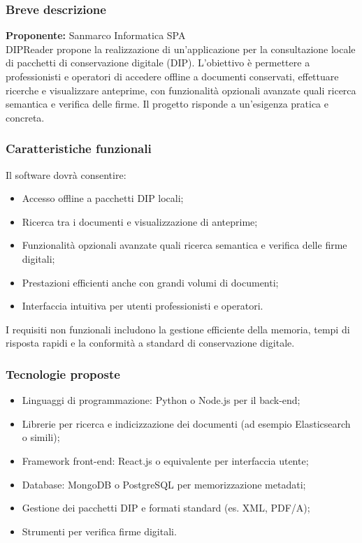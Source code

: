 \documentclass[a4paper,11pt]{article}
\begin{document}
\subsubsection{Breve descrizione}
\textbf{Proponente:} Sanmarco Informatica SPA
\vspace{0.5em}\\
DIPReader propone la realizzazione di un'applicazione per la consultazione locale di pacchetti di conservazione digitale (DIP). L'obiettivo è permettere a professionisti e operatori di accedere offline a documenti conservati, effettuare ricerche e visualizzare anteprime, con funzionalità opzionali avanzate quali ricerca semantica e verifica delle firme. Il progetto risponde a un'esigenza pratica e concreta.

\subsubsection{Caratteristiche funzionali}
Il software dovrà consentire:
\begin{itemize}[leftmargin=*]
  \item Accesso offline a pacchetti DIP locali;
  \item Ricerca tra i documenti e visualizzazione di anteprime;
  \item Funzionalità opzionali avanzate quali ricerca semantica e verifica delle firme digitali;
  \item Prestazioni efficienti anche con grandi volumi di documenti;
  \item Interfaccia intuitiva per utenti professionisti e operatori.
\end{itemize}
I requisiti non funzionali includono la gestione efficiente della memoria, tempi di risposta rapidi e la conformità a standard di conservazione digitale.

\subsubsection{Tecnologie proposte}
\begin{itemize}[leftmargin=*]
  \item Linguaggi di programmazione: Python o Node.js per il back-end;
  \item Librerie per ricerca e indicizzazione dei documenti (ad esempio Elasticsearch o simili);
  \item Framework front-end: React.js o equivalente per interfaccia utente;
  \item Database: MongoDB o PostgreSQL per memorizzazione metadati;
  \item Gestione dei pacchetti DIP e formati standard (es. XML, PDF/A);
  \item Strumenti per verifica firme digitali.
\end{itemize}
\end{document}
